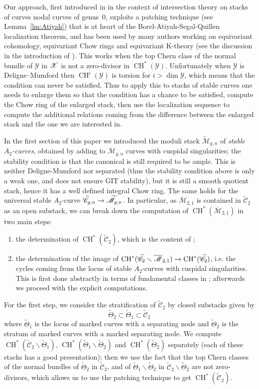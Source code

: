 \documentclass[a4paper, 10pt]{amsart}
\numberwithin{equation}{section}
\numberwithin{subsection}{section}
\newenvironment{enumerate1}
{\begin{enumerate}[\upshape (1)]}
	{\end{enumerate}}
\theoremstyle{definition}
\theoremstyle{remark}
\renewcommand{\mathcal}{\mathscr}
\newcommand\cM{\mathcal{M}} \newcommand\cN{\mathcal{N}}
\newcommand\cY{\mathcal{Y}} \newcommand\cZ{\mathcal{Z}}
\newcommand\arr{\ifinner\to\else\longrightarrow\fi}
\renewcommand{\setminus}{\smallsetminus}
\newcommand{\Mbar}{\overline{\cM}}
\newcommand{\Mtilde}{\widetilde{\mathcal M}}
\newcommand{\Ctilde}{\widetilde{\mathcal C}}
\newcommand{\ThTilde}{\widetilde{\Theta}}
\newcommand{\ch}[1][*]{\operatorname{CH}^{#1}}
\begin{document}
	Our approach, first introduced in \cite{fulghesu} in the context of intersection theory on stacks of curves nodal curves of genus~$0$, exploits a patching technique (see Lemma~\ref{lm:Atiyah}) that is at heart of the Borel-Atiyah-Segal-Quillen localization theorem, and has been used by many authors working on equivariant cohomology, equivariant Chow rings and equivariant K-theory (see the discussion in the introduction of \cite{DLV}). This works when the top Chern class of the normal bundle of $\cY$ in $\cX$ is not a zero-divisor in $\ch(\cY)$. Unfortunately when $\cY$ is Deligne--Mumford then $\ch[i](\cY)$ is torsion for $i > \dim \cY$, which means that the condition can never be satisfied. Thus to apply this to stacks of stable curves one needs to enlarge them so that the condition has a chance to be satisfied, compute the Chow ring of the enlarged stack, then use the localization sequence to compute the additional relations coming from the difference between the enlarged stack and the one we are interested in.
	
	In the first section of this paper we introduced the moduli stack $\Mtilde_{g,n}$ of \emph{stable $A_2$-curves}, obtained by adding to $\Mbar_{g,n}$ curves with cuspidal singularities; the stability condition is that the canonical is still required to be ample. This is neither Deligne-Mumford nor separated (thus the stability condition above is only a weak one, and does not ensure GIT stability), but it is still a smooth quotient stack, hence it has a well defined integral Chow ring. The same holds for the universal stable $A_2$-curve $\Ctilde_{g,n}\arr\Mtilde_{g,n}$. In particular, as $\Mbar_{2,1}$ is contained in $\Ctilde_2$ as an open substack, we can break down the computation of $\ch(\Mbar_{2,1})$ in two main steps:
	\begin{enumerate1}
		\item the determination of $\ch(\Ctilde_2)$, which is the content of ;
		\item the determination of the image of $\ch(\Ctilde_2\smallsetminus\Mbar_{2,1})\arr \ch(\Ctilde_2)$, i.e. the cycles coming from the locus of stable $A_2$-curves with cuspidal singularities. This is first done abstractly in terms of fundamental classes in ; afterwards we proceed with the explicit computations.
	\end{enumerate1}
	
	For the first step, we consider the stratification of $\Ctilde_2$ by closed substacks given by
	\[ \ThTilde_2 \subset \ThTilde_1 \subset \Ctilde_2 \]
	where $\ThTilde_1$ is the locus of marked curves with a separating node and $\ThTilde_2$ is the stratum of marked curves with a marked separating node. We compute $\ch(\Ctilde_2\smallsetminus\ThTilde_1)$, $\ch(\ThTilde_1\smallsetminus\ThTilde_2)$ and $\ch(\ThTilde_2)$ separately (each of these stacks has a good presentation); then we use the fact that the top Chern classes of the normal bundles of $\ThTilde_2$ in $\Ctilde_2$, and of $\ThTilde_1\smallsetminus\ThTilde_2$ in $\Ctilde_2 \setminus \ThTilde_2$ are not zero-divisors, which allows us to use the patching technique to get $\ch(\Ctilde_2)$.
	
\end{document}
